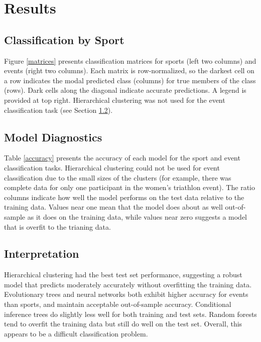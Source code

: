 \documentclass[12pt,letterpaper]{article} %
\begin{document}


\section{Results}

\subsection{Classification by Sport}

Figure \ref{matrices} presents classification matrices for sports (left two columns) and events (right two columns). Each matrix is row-normalized, so the darkest cell on a row indicates the modal predicted class (columns) for true members of the class (rows). Dark cells along the diagonal indicate accurate predictions. A legend is provided at top right. Hierarchical clustering was not used for the event classification task (see Section \ref{diagnostics}).




\subsection{Model Diagnostics}
\label{diagnostics}

Table \ref{accuracy} presents the accuracy of each model for the sport and event classification tasks. Hierarchical clustering could not be used for event classification due to the small sizes of the clusters (for example, there was complete data for only one participant in the women's triathlon event). The ratio columns indicate how well the model performs on the test data relative to the training data. Values near one mean that the model does about as well out-of-sample as it does on the training data, while values near zero suggests a model that is overfit to the trianing data.



\subsection{Interpretation}

Hierarchical clustering had the best test set performance, suggesting a robust model that predicts moderately accurately without overfitting the training data. Evolutionary trees and neural networks both exhibit higher accuracy for events than sports, and maintain acceptable out-of-sample accuracy. Conditional inference trees do slightly less well for both training and test sets. Random forests tend to overfit the training data but still do well on the test set. Overall, this appears to be a difficult classification problem.
\end{document}
